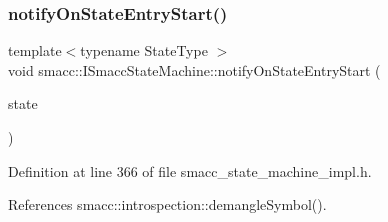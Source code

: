 \mbox{\label{classsmacc_1_1ISmaccStateMachine_aeec54e997d715b105ebfeb5caadc4fbf}} 
\subsubsection{\texorpdfstring{notify\+On\+State\+Entry\+Start()}{notifyOnStateEntryStart()}}
{\footnotesize\ttfamily template$<$typename State\+Type $>$ \\
void smacc\+::\+I\+Smacc\+State\+Machine\+::notify\+On\+State\+Entry\+Start (\begin{DoxyParamCaption}\item[{State\+Type $\ast$}]{state }\end{DoxyParamCaption})}



Definition at line 366 of file smacc\+\_\+state\+\_\+machine\+\_\+impl.\+h.



References smacc\+::introspection\+::demangle\+Symbol().


